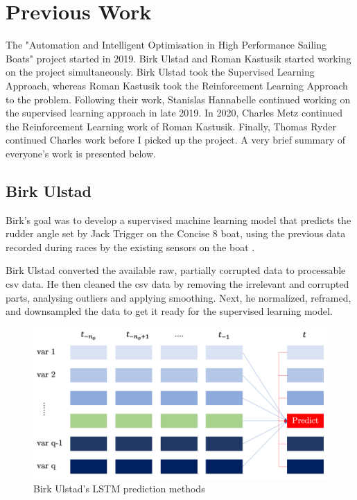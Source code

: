 \documentclass[12pt,twoside]{report}
\begin{document}
\section{Previous Work}
The "Automation and Intelligent Optimisation in High Performance Sailing Boats" project started in 2019. Birk Ulstad and Roman Kastusik started working on the project simultaneously. Birk Ulstad took the Supervised Learning Approach, whereas Roman Kastusik took the Reinforcement Learning Approach to the problem. Following their work, Stanislas Hannabelle continued working on the supervised learning approach in late 2019. In 2020, Charles Metz continued the Reinforcement Learning work of Roman Kastusik. Finally, Thomas Ryder continued Charles work before I picked up the project. A very brief summary of everyone's work is presented below.

\subsection{Birk Ulstad}
Birk's goal was to develop a supervised machine learning model that predicts the rudder angle set by Jack Trigger on the Concise 8 boat, using the previous data recorded during races by the existing sensors on the boat \cite{birk}.

Birk Ulstad converted the available raw, partially corrupted data to processable csv data. He then cleaned the csv data by removing the irrelevant and corrupted parts, analysing outliers and applying smoothing. Next, he normalized, reframed, and downsampled the data to get it ready for the supervised learning model.

\begin{figure}[h]
\centering
\includegraphics[width = 0.7\hsize]{figures/Birk Ulstad LSTM prediction.png}
\caption{Birk Ulstad's LSTM prediction methods}
\label{fig:birk lstm}
\end{figure}
\end{document}
